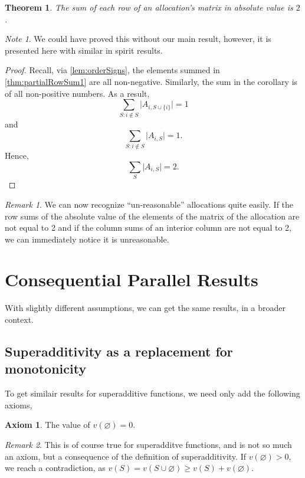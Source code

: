 \documentclass[12pt,letterpaper,final]{article}
\theoremstyle{plain}
\newtheorem{theorem}{Theorem}[section]
\theoremstyle{plain}
\theoremstyle{plain}
\theoremstyle{plain}
\theoremstyle{plain}
\theoremstyle{plain}
\theoremstyle{plain}
\theoremstyle{definition}
\theoremstyle{definition}
\theoremstyle{definition}
\theoremstyle{definition}
\theoremstyle{definition}
\newtheorem{axiom}{Axiom}[section]
\theoremstyle{remark}
\newtheorem*{remark}{Remark}
\theoremstyle{remark}
\newtheorem*{note}{Note}
\theoremstyle{remark}
\theoremstyle{remark}
\begin{document}
\begin{theorem}
  The sum of each row of an allocation's matrix in absolute value is
  \(2\).
\end{theorem}

\begin{note}
  We could have proved this without our main result, however, it is
  presented here with similar in spirit results.
\end{note}

\begin{proof}
  Recall, via \cref{lem:orderSigns}, the elements summed in
  \cref{thm:partialRowSum1} are all non-negative. Similarly,
  the sum in the corollary is of all non-positive numbers. As a
  result,
  \[
    \sum_{S: i\notin S} \lvert A_{i,S \cup \{i\}} \rvert= 1
  \]
  and
  \[
    \sum_{S: i\notin S} \lvert A_{i,S} \rvert= 1.
  \]
  Hence,
  \[
    \sum_{S} \lvert A_{i,S}\rvert= 2.
  \]
\end{proof}

\begin{remark}
  We can now recognize ``un-reasonable'' allocations quite easily. If
  the row sums of the absolute value of the elements of the matrix
  of the allocation are not equal to 2 and if the column sums of an
  interior column
  are not equal to 2, we can immediately notice it is unreasonable.
\end{remark}

 \section{Consequential Parallel Results}
\label{cha:cons-parall-results}

With slightly different assumptions, we can get the same results, in a
broader context.

\subsection{Superadditivity as a replacement for monotonicity}

To get similair results for superadditive functions, we need only add
the following axioms,

\begin{axiom}\label{ax:valueNothing}
  The value of \(v(\varnothing) = 0\). 
\end{axiom}

\begin{remark}
  This is of course true for superadditve functions, and is not so
  much an axiom, but a consequence of the definition of superadditivity.
  If \(v(\varnothing)>0\), we reach a contradiction, as
  \(v(S)=v(S\cup \varnothing) \geq v(S)+v(\varnothing)\).
\end{remark}
\end{document}
